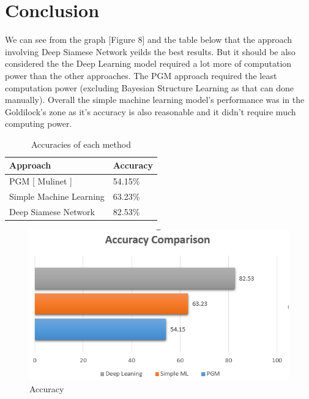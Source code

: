 \documentclass{article}
\begin{document}
\section{Conclusion}
 We can see from the graph [Figure 8] and the table below that the approach involving Deep Siamese Network yeilds the best results. But it should be also considered the the Deep Learning model required a lot more of computation power than the other approaches. The PGM approach required the least computation power (excluding Bayesian Structure Learning as that can done manually).
Overall the simple machine learning model's performance was in the Goldilock's zone as it's accuracy is also reasonable and it didn't require much computing power. \\
\begin{table}[!htb]
  \caption{Accuracies of each method}
  \label{sample-table}
  \centering
  \begin{tabular}{ll}           \\
    \cmidrule{1-2}
    Approach     & Accuracy \\
    \midrule
    PGM [ Mulinet ] & 54.15\%\\
    Simple Machine Learning      & 63.23\%\\
    Deep Siamese Network     & 82.53\%      \\
    \bottomrule
  \end{tabular}
\end{table}
\begin{figure}[H]
  \centering
  \includegraphics{accuracycomparison.png}
  \caption{Accuracy}
  
\end{figure}
\end{document}
